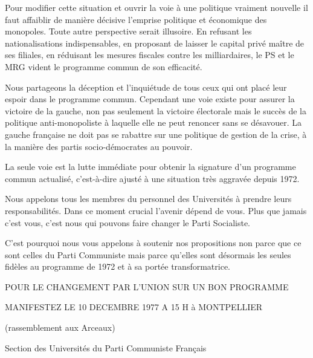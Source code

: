 Pour modifier cette situation et ouvrir la voie à une politique vraiment nouvelle il faut affaiblir de manière décisive l'emprise politique et économique des monopoles. Toute autre perspective serait illusoire. En refusant les nationalisations indispensables, en proposant de laisser le capital privé maître de ses filiales, en réduisant les mesures fiscales contre les milliardaires, le PS et le MRG vident le programme commun de son efficacité.

Nous partageons la déception et l'inquiétude de tous ceux qui ont placé leur espoir dans le programme commun. Cependant une voie existe pour assurer la victoire de la gauche, non pas seulement la victoire électorale mais le succès de la politique anti-monopoliste à laquelle elle ne peut renoncer sans se désavouer. La gauche française ne doit pas se rabattre sur une politique de gestion de la crise, à la manière des partis socio-démocrates au pouvoir.

La seule voie est la lutte immédiate pour obtenir la signature d'un programme commun actualisé, c'est-à-dire ajusté à une situation très aggravée depuis 1972.

Nous appelons tous les membres du personnel des Universités à prendre leurs responsabilités. Dans ce moment crucial l'avenir dépend de vous. Plus que jamais c'est vous, c'est nous qui pouvons faire changer le Parti Socialiste.

C'est pourquoi nous vous appelons à soutenir nos propositions non parce que ce sont celles du Parti Communiste mais parce qu'elles sont désormais les seules fidèles au programme de 1972 et à sa portée transformatrice.

\begin{center}
POUR LE CHANGEMENT PAR L'UNION SUR UN BON PROGRAMME
\end{center}

\begin{center}
MANIFESTEZ LE 10 DECEMBRE 1977 A 15 H à MONTPELLIER
\end{center}
\begin{flushright}
(rassemblement aux Arceaux)
\end{flushright}

\begin{flushright}
Section des Universités du Parti Communiste Français
\end{flushright}
